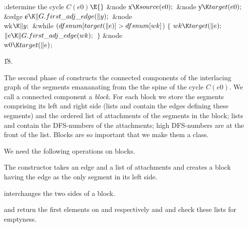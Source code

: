 \Y\B\4:determine the cycle $C(e0)$\X${}\E{}$\6
\&{node} \|x${}\K\\{source}(\\{e0});{}$\6
\&{node} \|y${}\K\\{target}(\\{e0});{}$\6
\&{edge} \|e${}\K\|G.\\{first\_adj\_edge}(\|y);{}$\6
\&{node} \\{wk}${}\K\|y;{}$\7
\&{while} ${}(\\{dfsnum}[\\{target}(\|e)]>\\{dfsnum}[\\{wk}]{}$)\6
${}\{{}$\1\6
${}\\{wk}\K\\{target}(\|e);{}$\6
${}\|e\K\|G.\\{first\_adj\_edge}(\\{wk});{}$\6
\4${}\}{}$\2\7
\&{node} \\{w0}${}\K\\{target}(\|e){}$;\par
\U18.\fi

The second phase of  constructs the connected
components of
the interlacing graph of the segments emananating from the the spine of the
cycle $C(e0)$. We call a connected component a {\em block}. For each block
we store the segments comprising its left and right side (lists
 and  contain the edges
defining these segments) and the ordered list of attachments of the segments
in the block; lists  and  contain the DFS-numbers of
the
attachments; high DFS-numbers are at the front of the list. Blocks are
so important that we make them a class.

We need the following operations on blocks.

The constructor takes an edge and a list of attachments and creates
a block having the edge as the only segment in its left side.

 interchanges the two sides of a block.

 and  return the first elements
on  and  respectively
and  and  check these lists for
emptyness.

